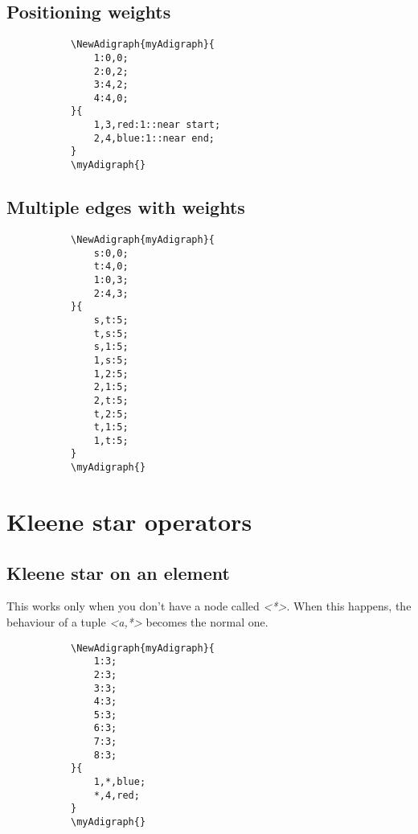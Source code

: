 \documentclass{report}
\begin{document}
\subsection{Positioning weights}
\begin{figure}
	\begin{subfigure}{0.49\textwidth}
		\begin{verbatim}
\NewAdigraph{myAdigraph}{
	1:0,0;
	2:0,2;
	3:4,2;
	4:4,0;
}{
	1,3,red:1::near start;
	2,4,blue:1::near end;
}
\myAdigraph{}
\end{verbatim}
	\end{subfigure}
	\begin{subfigure}{0.49\textwidth}
		\myAdigraph{}
	\end{subfigure}
\end{figure}


\subsection{Multiple edges with weights}
\begin{figure}
	\begin{subfigure}{0.49\textwidth}
		\begin{verbatim}
\NewAdigraph{myAdigraph}{
	s:0,0;
	t:4,0;
	1:0,3;
	2:4,3;
}{
	s,t:5;
	t,s:5;
	s,1:5;
	1,s:5;
	1,2:5;
	2,1:5;
	2,t:5;
	t,2:5;
	t,1:5;
	1,t:5;
}
\myAdigraph{}
\end{verbatim}
	\end{subfigure}
	\begin{subfigure}{0.49\textwidth}
		\myAdigraph{}
	\end{subfigure}
\end{figure}

\section{Kleene star operators}
\subsection{Kleene star on an element}
This works only when you don't have a node called \textit{<*>}. When this happens, the behaviour of a tuple \textit{<a,*>} becomes the normal one.
\begin{figure}
	\begin{subfigure}{0.49\textwidth}
		\begin{verbatim}
\NewAdigraph{myAdigraph}{
	1:3;
	2:3;
	3:3;
	4:3;
	5:3;
	6:3;
	7:3;
	8:3;
}{
	1,*,blue;
	*,4,red;
}
\myAdigraph{}
\end{verbatim}
	\end{subfigure}
	\begin{subfigure}{0.49\textwidth}
		\myAdigraph{}
	\end{subfigure}
\end{figure}
\end{document}
